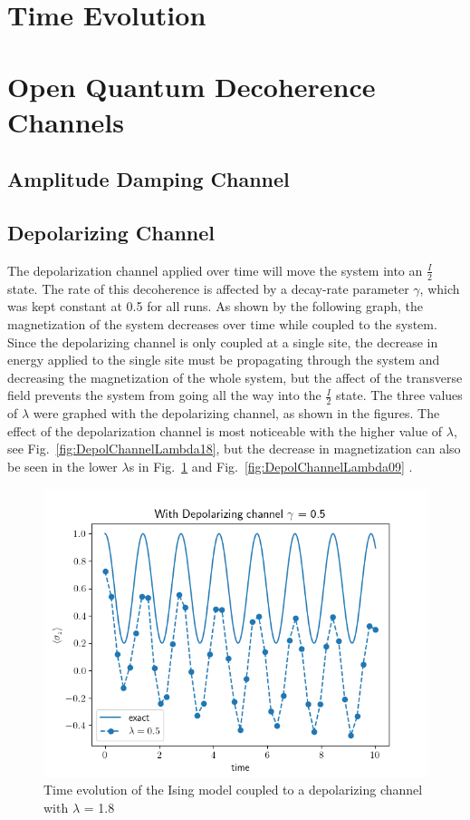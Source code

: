 \documentclass[12pt]{article}
\begin{document}
  \section{Time Evolution}

  \section{Open Quantum Decoherence Channels}

  \subsection{Amplitude Damping Channel}

  \subsection{Depolarizing Channel}
The depolarization channel applied over time will move the system into an $\frac{I}{2}$ state. The rate of this decoherence is affected by a decay-rate parameter $\gamma$, which was kept constant at 0.5 for all runs. As shown by the following graph, the magnetization of the system decreases over time while coupled to the system. Since the depolarizing channel is only coupled at a single site, the decrease in energy applied to the single site must be propagating through the system and decreasing the magnetization of the whole system, but the affect of the transverse field prevents the system from going all the way into the $\frac{I}{2}$ state. The three values of $\lambda$ were graphed with the depolarizing channel, as shown in the figures. The effect of the depolarization channel is most noticeable with the higher value of $\lambda$, see Fig.~\ref{fig:DepolChannelLambda18},  but the decrease in magnetization can also be seen in the lower $\lambda$s in Fig.~\ref{fig:DepolChannelLambda05} and Fig.~\ref{fig:DepolChannelLambda09} .

\begin{figure}[!htb]
    \centering
    \includegraphics[width=\textwidth]{images/DepolChannelLambda05.png}
    \caption{Time evolution of the Ising model coupled to a depolarizing channel with $\lambda$ = 1.8%
      \label{fig:DepolChannelLambda05}}
  \end{figure}
\end{document}
